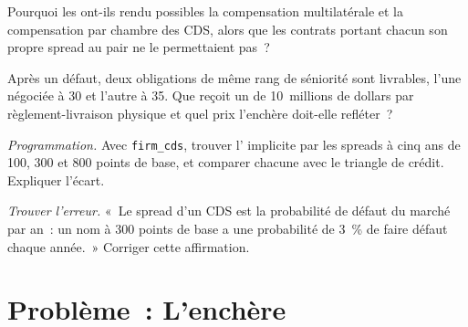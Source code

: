 \begin{exercise}[$\star\star$]\label{exo:m2:credit-default-swaps:5}
Pourquoi les  ont-ils rendu possibles la compensation multilatérale et la compensation par chambre des CDS, alors que les contrats
portant chacun son propre spread au pair ne le permettaient pas~?
\end{exercise}

\begin{exercise}[$\star\star$]\label{exo:m2:credit-default-swaps:6}
Après un défaut, deux obligations de même rang de séniorité sont livrables, l'une négociée à 30 et
l'autre à 35. Que reçoit un  de 10~millions de dollars par règlement-livraison physique
et quel prix l'enchère doit-elle refléter~?
\end{exercise}

\begin{exercise}[$\star\star\star$]\label{exo:m2:credit-default-swaps:7}
\emph{Programmation.} Avec \texttt{firm\_cds}, trouver l' implicite par les spreads à cinq ans
de 100, 300 et 800 points de base, et comparer chacune avec le triangle de crédit.
Expliquer l'écart.
\end{exercise}

\begin{exercise}[$\star\star\star$]\label{exo:m2:credit-default-swaps:8}
\emph{Trouver l'erreur.} «~Le spread d'un CDS est la probabilité de défaut du marché par
an~: un nom à 300 points de base a une probabilité de 3~\% de faire défaut chaque année.~» Corriger cette affirmation.
\end{exercise}

\section{Problème~: L'enchère}

